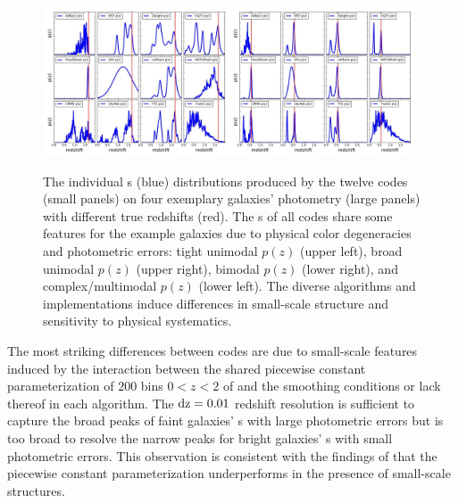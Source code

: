 \begin{figure}
	\includegraphics[width=0.49\textwidth]{figures/pzdc1/pz_12codes_713178_noseaborn_crop.jpg}\includegraphics[width=0.49\textwidth]{figures/pzdc1/pz_12codes_982747_noseaborn_crop.jpg}
	\caption{The individual \pzpdf s (blue) distributions produced by the twelve codes (small panels) on four exemplary galaxies' photometry (large panels) with different true redshifts (red).
		The \pzpdf s of all codes share some features for the example galaxies due to physical color degeneracies and photometric errors: tight unimodal $p(z)$ (upper left), broad unimodal $p(z)$ (upper right), bimodal $p(z)$ (lower right), and complex/multimodal $p(z)$ (lower left).
		The diverse algorithms and implementations induce differences in small-scale structure and sensitivity to physical systematics.}
\end{figure}

The most striking differences between codes are due to small-scale features induced by the interaction between the shared piecewise constant parameterization of $200$ bins $0 < z < 2$ of  and the smoothing conditions or lack thereof in each algorithm.
The $\rm{d}z = 0.01$ redshift resolution is sufficient to capture the broad peaks of faint galaxies' \pzpdf s with large photometric errors but is too broad to resolve the narrow peaks for bright galaxies' \pzpdf s with small photometric errors.
This observation is consistent with the findings of \citet[]{Malz:qp} that the piecewise constant parameterization underperforms in the presence of small-scale structures.

